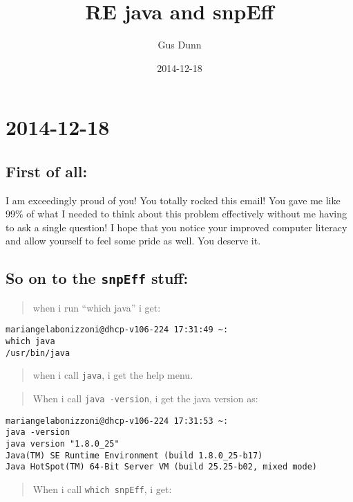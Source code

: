 \documentclass[letterpaper]{scrartcl}
\title{RE java and snpEff}
\author{Gus Dunn}
\date{2014-12-18}
\begin{document}
\maketitle

\section{2014-12-18}\label{section}

\subsection{First of all:}\label{first-of-all}

I am exceedingly proud of you! You totally rocked this email! You gave
me like 99\% of what I needed to think about this problem effectively
without me having to ask a single question! I hope that you notice your
improved computer literacy and allow yourself to feel some pride as
well. You deserve it.

\subsection{So on to the \texttt{snpEff}
stuff:}\label{so-on-to-the-snpeff-stuff}

\begin{quote}
when i run ``which java'' i get:
\end{quote}

\begin{verbatim}
mariangelabonizzoni@dhcp-v106-224 17:31:49 ~:
which java
/usr/bin/java
\end{verbatim}

\begin{quote}
when i call \texttt{java}, i get the help menu.
\end{quote}

\begin{quote}
When i call \texttt{java -version}, i get the java version as:
\end{quote}

\begin{verbatim}
mariangelabonizzoni@dhcp-v106-224 17:31:53 ~:
java -version
java version "1.8.0_25"
Java(TM) SE Runtime Environment (build 1.8.0_25-b17)
Java HotSpot(TM) 64-Bit Server VM (build 25.25-b02, mixed mode)
\end{verbatim}

\begin{quote}
When i call \texttt{which snpEff}, i get:
\end{quote}
\end{document}
